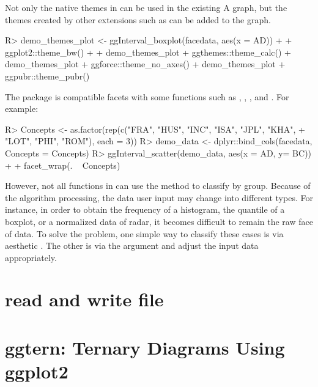 \documentclass[article]{jss}
\begin{document}
Not only the native themes in  can be used in the existing A graph, but the themes created by other  extensions such as  can be added to the graph.
\begin{CodeChunk}
\begin{CodeInput}
R> demo_themes_plot <- ggInterval_boxplot(facedata, aes(x = AD)) +
+      ggplot2::theme_bw()
+
+  demo_themes_plot + ggthemes::theme_calc()
+  demo_themes_plot + ggforce::theme_no_axes()
+  demo_themes_plot + ggpubr::theme_pubr()
\end{CodeInput}
\end{CodeChunk}

The  package is compatible  facets with some functions such as , , , and . For example:
\begin{CodeChunk}
\begin{CodeInput}
R> Concepts <- as.factor(rep(c("FRA", "HUS", "INC", "ISA", "JPL", "KHA",
+                             "LOT", "PHI", "ROM"), each = 3))
R> demo_data <- dplyr::bind_cols(facedata, Concepts = Concepts)
R> ggInterval_scatter(demo_data, aes(x = AD, y= BC)) + 
+      facet_wrap(. ~ Concepts)
\end{CodeInput}
\end{CodeChunk}

However, not all functions in  can use the method to classify by group. Because of the algorithm processing, the data user input may change into different types. For instance, in order to obtain the frequency of a histogram, the quantile of a boxplot, or a normalized data of radar, it becomes difficult to remain the raw face of data. To solve the problem, one simple way to classify these cases is via aesthetic . The other is via the  argument and adjust the input data appropriately.














\section*{read and write file}



\section*{ggtern: Ternary Diagrams Using ggplot2}
\end{document}
